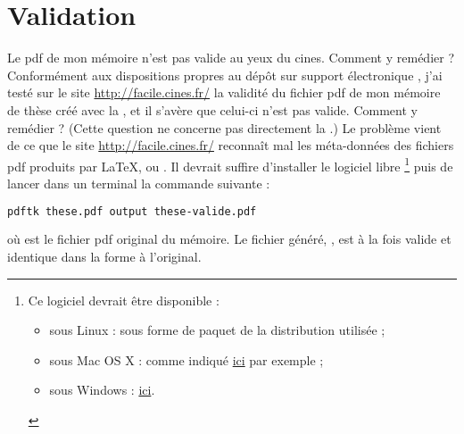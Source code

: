 \section{Validation}
\label{sec-validation}

\begin{dbfaq}{Le \acrshort{pdf} de mon mémoire n'est pas valide au yeux du
    \acrshort{cines}. Comment y remédier ?}{}
  Conformément aux dispositions propres au dépôt sur support électronique
  \autocite{guidoct-abes}, j'ai testé sur le site \url{http://facile.cines.fr/}
  la validité du fichier \acrshort{pdf} de mon mémoire de thèse créé avec la
  \yatCl{}, et il s'avère que celui-ci n'est pas valide. Comment y remédier ?
  \tcblower
  (Cette question ne concerne pas directement la \yatCl{}.) Le problème vient de
  ce que le site \url{http://facile.cines.fr/} reconnaît mal les méta-données
  des fichiers \acrshort{pdf} produits par \LaTeX{},  ou
  . Il devrait suffire d'installer le logiciel libre
  \footnote{Ce logiciel devrait être disponible :
    \begin{itemize}
    \item sous Linux : sous forme de paquet de la distribution utilisée ;
    \item sous Mac OS X : comme indiqué
      \href{http://stackoverflow.com/q/20804441}{ici} par exemple ;
    \item sous Windows : \href{https://www.pdflabs.com/tools/pdftk-the-pdf-toolkit/}{ici}.
    \end{itemize}
  }%
  puis de lancer dans un terminal la commande suivante :
\begin{lstlisting}[language=bash]
pdftk these.pdf output these-valide.pdf
\end{lstlisting}
où  est le fichier \acrshort{pdf} original du mémoire. Le
fichier généré, , est à la fois valide et identique dans
la forme à l'original.
\end{dbfaq}

%
\iffalse
\fi
